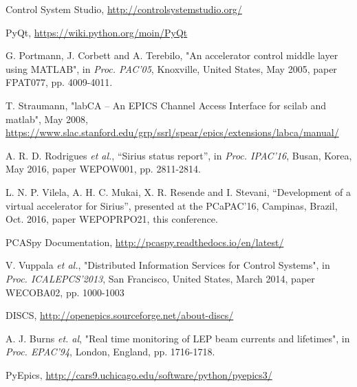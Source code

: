 \documentclass[a4paper,
              ]{jacow}
\begin{document}
\begin{thebibliography}{99}

		Control System Studio, \url{http://controlsystemstudio.org/}

		PyQt, \url{https://wiki.python.org/moin/PyQt}

		 G. Portmann, J. Corbett and A. Terebilo,
		 "An accelerator control middle layer using MATLAB",
		 in \emph{Proc. PAC'05},
		 Knoxville, United States, May 2005,
		 paper FPAT077, pp. 4009-4011.

		T. Straumann,
		"labCA -- An EPICS Channel Access Interface for scilab and matlab",
		May 2008,
		\url{https://www.slac.stanford.edu/grp/ssrl/spear/epics/extensions/labca/manual/}

		A. R. D. Rodrigues \emph{et al.},
		“Sirius status report”,
		in \emph{Proc. IPAC'16},
		Busan, Korea, May 2016,
		paper WEPOW001, pp. 2811-2814.

		L. N. P. Vilela, A. H. C. Mukai, X. R. Resende and I. Stevani,
		“Development of a virtual accelerator for Sirius”,
		presented at the PCaPAC'16,
		Campinas, Brazil, Oct. 2016,
		paper WEPOPRPO21, this conference.

		PCASpy Documentation, \url{http://pcaspy.readthedocs.io/en/latest/}

		V. Vuppala \emph{et al.},
		"Distributed Information Services for Control Systems",
		in \emph{Proc. ICALEPCS'2013},
		San Francisco, United States, March 2014,
		paper WECOBA02, pp. 1000-1003

		DISCS, \url{http://openepics.sourceforge.net/about-discs/}

	 	A. J. Burns \emph{et. al},
	 	"Real time monitoring of LEP beam currents and lifetimes",
	 	in \emph{Proc. EPAC'94},
	 	London, England, pp. 1716-1718.
	 	
		PyEpics, \url{http://cars9.uchicago.edu/software/python/pyepics3/}

\end{thebibliography}
\end{document}
